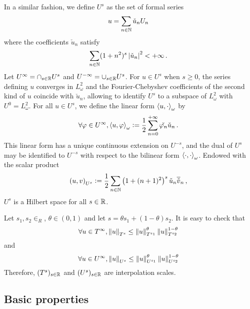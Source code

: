 \documentclass[a4paper]{article}
\begin{document}
\begin{Def}
	In a similar fashion, we define $U^{s}$ as the set of formal series 
	\[u = \sum_{n \in \mathbb{N}}\check{u}_n U_n\]
	where the coefficients $\check{u}_n$ satisfy
	\[\sum_{n \in \mathbb{N}} (1 + n^2)^s \left\lvert \check{u}_n \right\rvert^2 < + \infty\,.\]
	Let $U^\infty = \cap_{s \in \mathbb{R}} U^s$ and $U^{-\infty} = \cup_{s \in \mathbb{R}} U^s$. For $u \in U^s$ when $s \geq 0$, the series defining $u$ converges in $L^2_{\omega}$ and the Fourier-Chebyshev coefficients of the second kind of $u$ coincide with $\check{u}_n$, allowing to identify $U^s$ to a subspace of $L^2_{\omega}$ with $U^0 = L^2_\omega$. For all $u \in U^s$, we define the linear form $\left\langle u,\cdot\right\rangle_\omega$ by 
	\begin{equation}
		\label{dualiteUs}
		\forall \varphi \in U^\infty, \left\langle u,\varphi\right\rangle_\omega \mathrel{\mathop:}= \frac{1}{2} \sum_{n = 0}^{+ \infty} \check{\varphi_n}\check{u}_n\,.
	\end{equation}
	This linear form has a unique continuous extension on $U^{-s}$, and the dual of $U^s$ may be identified to $U^{-s}$ with respect to the bilinear form $\left\langle \cdot,\cdot\right\rangle_{\omega}$.
	Endowed with the scalar product
	\[\left( u,v\right)_{U^s} \mathrel{\mathop:}= \frac{1}{2}\sum_{n \in \mathbb{N}} \left(1 + (n + 1)^2\right)^s \check{u}_n \overline{\check{v}}_n\,,\] 
	$U^s$ is a Hilbert space for all $s \in \mathbb{R}$. 
\end{Def}

Let $s_1,s_2 \in _R$, $\theta \in (0,1)$ and let $s = \theta s_1 + (1-\theta)s_2$. It is easy to check that
\[\forall u \in T^\infty, \left\|u\right\|_{T^s} \leq \left\|u\right\|_{T^{s_1}}^\theta \left\|u\right\|_{T^{s_2}}^{1 - \theta}\]
and 
\[\forall u \in U^\infty, \left\|u\right\|_{U^s} \leq \left\|u\right\|_{U^{s_1}}^\theta \left\|u\right\|_{U^{s_2}}^{1 - \theta}\]
Therefore, $(T^s)_{s \in \mathbb{R}}$ and $(U^s)_{s \in \mathbb{R}}$ are interpolation scales. 

\subsection{Basic properties}
\end{document}
